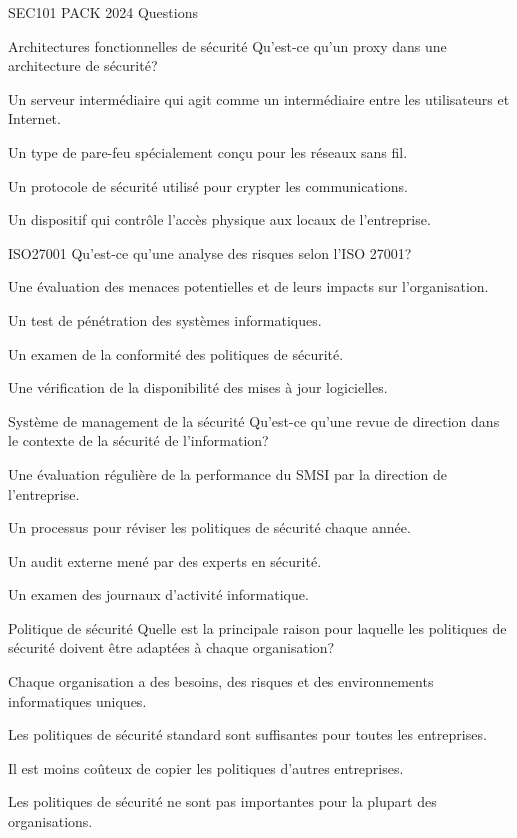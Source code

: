 \documentclass[12pt]{article}
\begin{document}
\begin{quiz}{SEC101 PACK 2024 Questions}
\begin{multi}[points=1]{Architectures fonctionnelles de sécurité}
Qu'est-ce qu'un proxy dans une architecture de sécurité?
\item* Un serveur intermédiaire qui agit comme un intermédiaire entre les utilisateurs et Internet.
\item Un type de pare-feu spécialement conçu pour les réseaux sans fil.
\item Un protocole de sécurité utilisé pour crypter les communications.
\item Un dispositif qui contrôle l'accès physique aux locaux de l'entreprise.
\end{multi}

\begin{multi}[points=1]{ISO27001}
Qu'est-ce qu'une analyse des risques selon l'ISO 27001?
\item* Une évaluation des menaces potentielles et de leurs impacts sur l'organisation.
\item Un test de pénétration des systèmes informatiques.
\item Un examen de la conformité des politiques de sécurité.
\item Une vérification de la disponibilité des mises à jour logicielles.
\end{multi}

\begin{multi}[points=1]{Système de management de la sécurité}
Qu'est-ce qu'une revue de direction dans le contexte de la sécurité de l'information?
\item* Une évaluation régulière de la performance du SMSI par la direction de l'entreprise.
\item Un processus pour réviser les politiques de sécurité chaque année.
\item Un audit externe mené par des experts en sécurité.
\item Un examen des journaux d'activité informatique.
\end{multi}

\begin{multi}[points=1]{Politique de sécurité}
Quelle est la principale raison pour laquelle les politiques de sécurité doivent être adaptées à chaque organisation?
\item* Chaque organisation a des besoins, des risques et des environnements informatiques uniques.
\item Les politiques de sécurité standard sont suffisantes pour toutes les entreprises.
\item Il est moins coûteux de copier les politiques d'autres entreprises.
\item Les politiques de sécurité ne sont pas importantes pour la plupart des organisations.
\end{multi}


\end{quiz}
\end{document}
